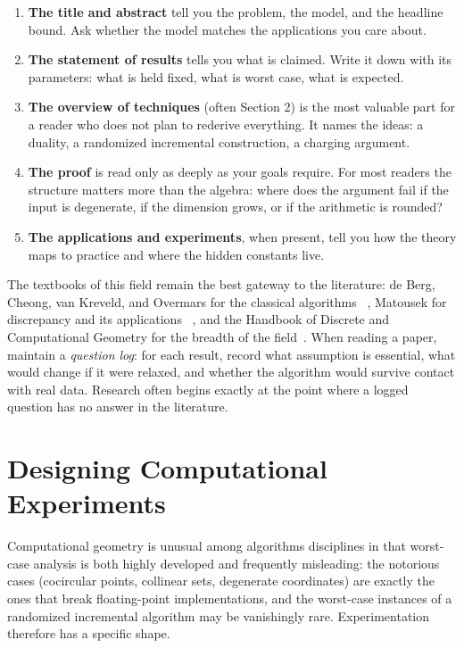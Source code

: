 \begin{enumerate}
\item \textbf{The title and abstract} tell you the problem, the model, and the
  headline bound. Ask whether the model matches the applications you care
  about.
\item \textbf{The statement of results} tells you what is claimed. Write it
  down with its parameters: what is held fixed, what is worst case, what is
  expected.
\item \textbf{The overview of techniques} (often Section 2) is the most
  valuable part for a reader who does not plan to rederive everything. It names
  the ideas: a duality, a randomized incremental construction, a charging
  argument.
\item \textbf{The proof} is read only as deeply as your goals require. For most
  readers the structure matters more than the algebra: where does the argument
  fail if the input is degenerate, if the dimension grows, or if the arithmetic
  is rounded?
\item \textbf{The applications and experiments}, when present, tell you how
  the theory maps to practice and where the hidden constants live.
\end{enumerate}

The textbooks of this field remain the best gateway to the literature: de Berg,
Cheong, van Kreveld, and Overmars for the classical algorithms
~\cite{deberg2008,berg2008}, Matousek for discrepancy and its applications
~\cite{matousek1999}, and the Handbook of Discrete and Computational Geometry
for the breadth of the field~\cite{goodman2017}. When reading a paper, maintain
a \emph{question log}: for each result, record what assumption is essential,
what would change if it were relaxed, and whether the algorithm would survive
contact with real data. Research often begins exactly at the point where a
logged question has no answer in the literature.

\section{Designing Computational Experiments}
\label{sec:frontiers_experiments}

Computational geometry is unusual among algorithms
disciplines in that worst-case analysis is both highly developed and frequently
misleading: the notorious cases (cocircular points, collinear sets, degenerate
coordinates) are exactly the ones that break floating-point implementations,
and the worst-case instances of a randomized incremental algorithm may be
vanishingly rare. Experimentation therefore has a specific shape.

